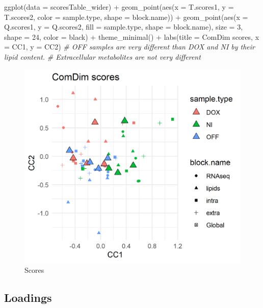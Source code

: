 \documentclass[
]{book}
\newenvironment{Shaded}{\begin{snugshade}}{\end{snugshade}}
\newcommand{\AttributeTok}[1]{\textcolor[rgb]{0.77,0.63,0.00}{#1}}
\newcommand{\CommentTok}[1]{\textcolor[rgb]{0.56,0.35,0.01}{\textit{#1}}}
\newcommand{\DecValTok}[1]{\textcolor[rgb]{0.00,0.00,0.81}{#1}}
\newcommand{\FunctionTok}[1]{\textcolor[rgb]{0.00,0.00,0.00}{#1}}
\newcommand{\NormalTok}[1]{#1}
\newcommand{\SpecialCharTok}[1]{\textcolor[rgb]{0.00,0.00,0.00}{#1}}
\newcommand{\StringTok}[1]{\textcolor[rgb]{0.31,0.60,0.02}{#1}}
\begin{document}
\begin{Shaded}
\begin{Highlighting}[]
\FunctionTok{ggplot}\NormalTok{(}\AttributeTok{data =}\NormalTok{ scoresTable\_wider) }\SpecialCharTok{+}
  \FunctionTok{geom\_point}\NormalTok{(}\FunctionTok{aes}\NormalTok{(}\AttributeTok{x =}\NormalTok{ T.scores1, }\AttributeTok{y =}\NormalTok{ T.scores2, }\AttributeTok{color =}\NormalTok{ sample.type,}
                 \AttributeTok{shape =}\NormalTok{ block.name)) }\SpecialCharTok{+}
  \FunctionTok{geom\_point}\NormalTok{(}\FunctionTok{aes}\NormalTok{(}\AttributeTok{x =}\NormalTok{ Q.scores1, }\AttributeTok{y =}\NormalTok{ Q.scores2,}
                 \AttributeTok{fill =}\NormalTok{ sample.type, }\AttributeTok{shape =}\NormalTok{ block.name),}
             \AttributeTok{size =} \DecValTok{3}\NormalTok{, }\AttributeTok{shape =} \DecValTok{24}\NormalTok{, }\AttributeTok{color =} \StringTok{\textquotesingle{}black\textquotesingle{}}\NormalTok{) }\SpecialCharTok{+}
  \FunctionTok{theme\_minimal}\NormalTok{() }\SpecialCharTok{+}
  \FunctionTok{labs}\NormalTok{(}\AttributeTok{title =} \StringTok{\textquotesingle{}ComDim scores\textquotesingle{}}\NormalTok{, }\AttributeTok{x =} \StringTok{\textquotesingle{}CC1\textquotesingle{}}\NormalTok{, }\AttributeTok{y =} \StringTok{\textquotesingle{}CC2\textquotesingle{}}\NormalTok{)}
  \CommentTok{\# OFF samples are very different than DOX and NI by their lipid content.}
  \CommentTok{\# Extracellular metabolites are not very different}
\end{Highlighting}
\end{Shaded}

\begin{figure}

{\centering \includegraphics[width=0.5\linewidth]{Figs/fig4_2} 

}

\caption{Scores}\label{fig:unnamed-chunk-9}
\end{figure}

\hypertarget{loadings}{%
\subsection{Loadings}\label{loadings}}
\end{document}
